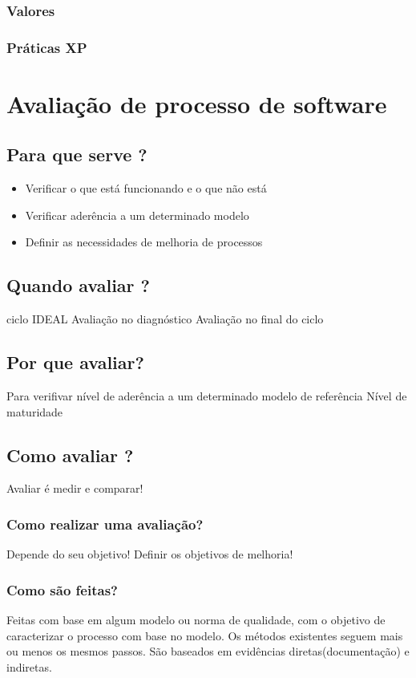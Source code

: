 \documentclass{article}
\begin{document}
\subsubsection{Valores}
\subsubsection{Práticas XP}

\section{Avaliação de processo de software} \date{23 de Abril de 2014}

\subsection{Para que serve ?}
	\begin{itemize}
	\item Verificar o que está funcionando e o que não está
	\item Verificar aderência a um determinado modelo
	\item Definir as necessidades de melhoria de processos	
	\end{itemize}	

\subsection{Quando avaliar ?}
	ciclo IDEAL
	Avaliação no diagnóstico
	Avaliação no final do ciclo
	
\subsection{Por que avaliar?}
	Para verifivar nível de aderência a um determinado modelo de referência
	Nível de maturidade

\subsection{Como avaliar ?}
	Avaliar é medir e comparar!
	\subsubsection{Como realizar uma avaliação?}
		Depende do seu objetivo!
		Definir os objetivos de melhoria!
	\subsubsection{Como são feitas?}
		Feitas com base em algum modelo ou norma de qualidade, com o objetivo de caracterizar o processo com base no modelo.
		Os métodos existentes seguem mais ou menos os mesmos passos.
		São baseados em evidências diretas(documentação) e indiretas.
		
\end{document}
